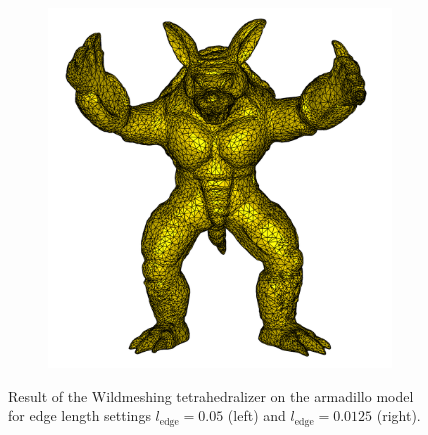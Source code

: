 \documentclass[acmtog]{acmart}
\begin{document}
\begin{figure}[H]
\begin{subfigure}{0.22\textwidth}
    \includegraphics[width=\textwidth]{Images/armadillo_fine.png}
    \centering
  \end{subfigure}\hfill
  \caption{Result of the Wildmeshing tetrahedralizer on the armadillo model for edge length settings $l_\mathrm{edge}  = 0.05$ (left) and $l_\mathrm{edge}  = 0.0125$ (right).}
\end{figure}
\end{document}
